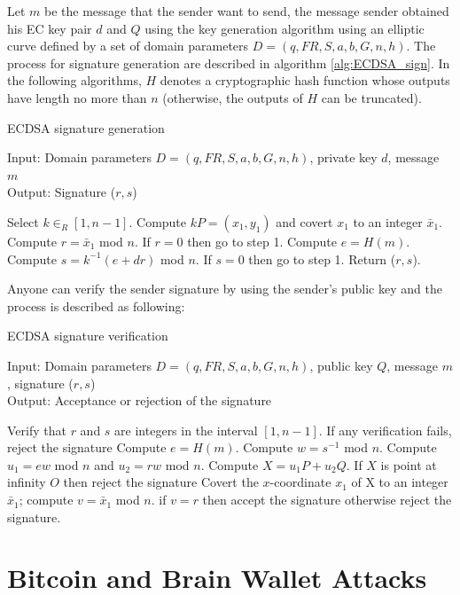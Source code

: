 Let $m$ be the message that the sender want to send, the message sender obtained his EC key pair $d$ and $Q$ using the key generation algorithm using an elliptic curve defined by a set of domain parameters $D=(q,FR,S,a,b,G,n,h)$. The process for signature generation are described in algorithm \ref{alg:ECDSA_sign}. In the following algorithms, $H$ denotes a cryptographic hash function whose outputs have length no more than $n$ (otherwise, the outputs of $H$ can be truncated).

\begin{algorithm}[H] 
	\caption{ECDSA signature generation\cite{hankerson2006guide}}
		Input: Domain parameters $D=(q,FR,S,a,b,G,n,h)$, private key $d$, message $m$ \\
		Output:  Signature ($r,s$)
	\label{alg:ECDSA_sign}
	\begin{algorithmic} [1]
		\STATE Select $k \in _R \left[ 1, n-1 \right] $.
		\STATE Compute $kP=(x_1,y_1)$ and covert $x_1$ to an integer $\bar{x}_1$.
		\STATE Compute $r = \bar{x}_1$ mod $n$. If $r = 0$ then go to step 1.
		\STATE Compute $e = H(m)$.
		\STATE Compute $s = k^{-1}(e+dr)$ mod $n$. If $s=0$ then go to step 1.
		\STATE Return ($r,s$).
	\end{algorithmic}
\end{algorithm}
Anyone can verify the sender signature by using the sender's public key and the process is described as following:
\begin{algorithm}[H] 
	\caption{ECDSA signature verification\cite{hankerson2006guide}}
	Input: Domain parameters $D=(q,FR,S,a,b,G,n,h)$, public key $Q$, message $m$, signature ($r,s$) \\
	Output:  Acceptance or rejection of the signature
	\label{alg:ECDSA_verify}
	\begin{algorithmic} [1]
		\STATE Verify that $r$ and $s$ are integers in the interval $[1,n-1]$. If any verification fails, reject the signature
		\STATE Compute $e = H(m)$.
		\STATE Compute $w=s^{-1}$ mod $n$.
		\STATE Compute $u_1 = ew$ mod $n$ and $u_2=rw$ mod $n$.
		\STATE Compute $X = u_1P+u_2Q$.
		\STATE If $X$ is point at infinity $O$ then reject the signature
		\STATE Covert the $x$-coordinate $x_1$ of X to an integer $\bar{x}_1$; compute $v=\bar{x}_1$ mod $n$.
		\STATE if $v=r$ then accept the signature otherwise reject the signature.
	\end{algorithmic}
\end{algorithm}

\chapter{Bitcoin and Brain Wallet Attacks}

